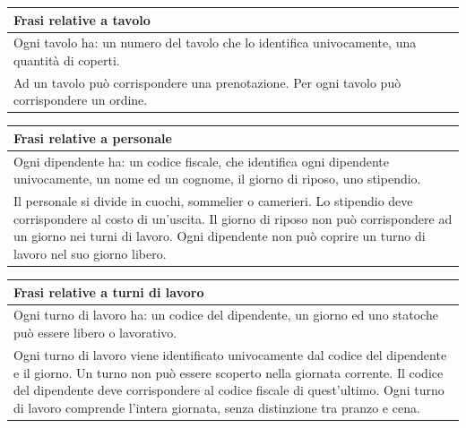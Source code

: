 \begin{longtable}{|p{15.5cm}|}
    \hline
    \textbf{Frasi relative a tavolo} \\ \hline
    Ogni tavolo ha: un numero del tavolo che lo identifica univocamente, una quantità di coperti. \\
Ad un tavolo può corrispondere una prenotazione. 
Per ogni tavolo può corrispondere un ordine.
    \\ \hline
\end{longtable}

\begin{longtable}{|p{15.5cm}|}
    \hline
    \textbf{Frasi relative a personale} \\ \hline
    Ogni dipendente ha: un codice fiscale, che identifica ogni dipendente univocamente, un nome ed un cognome, il giorno di riposo, uno stipendio. \\
    Il personale si divide in cuochi, sommelier o camerieri.
    Lo stipendio deve corrispondere al costo di un'uscita. 
    Il giorno di riposo non può corrispondere ad un giorno nei turni di lavoro. 
    Ogni dipendente non può coprire un turno di lavoro nel suo giorno libero.
    \\ \hline
\end{longtable}

\begin{longtable}{|p{15.5cm}|}
    \hline
    \textbf{Frasi relative a turni di lavoro} \\ \hline
    Ogni turno di lavoro ha: un codice del dipendente, un giorno ed uno statoche può essere libero o lavorativo. \\
Ogni turno di lavoro viene identificato univocamente dal codice del dipendente e il giorno.
Un turno non può essere scoperto nella giornata corrente. 
Il codice del dipendente deve corrispondere al codice fiscale di quest'ultimo. 
Ogni turno di lavoro comprende l'intera giornata, senza distinzione tra pranzo e cena.
    \\ \hline
\end{longtable}


